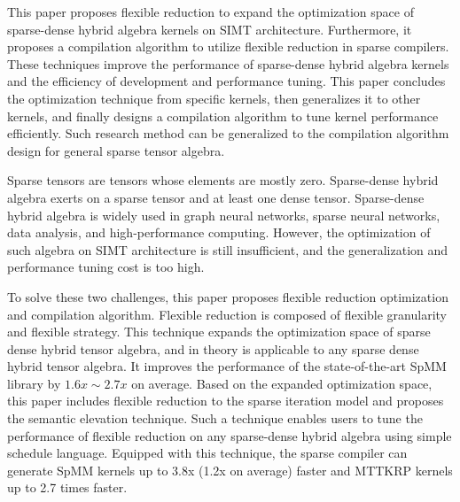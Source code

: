 \begin{abstract*}
  This paper proposes flexible reduction to expand the optimization space of sparse-dense hybrid algebra kernels on SIMT architecture.
  Furthermore, it proposes a compilation algorithm to utilize flexible reduction in sparse compilers. These techniques improve the performance of 
  sparse-dense hybrid algebra kernels and the efficiency of development and performance tuning. This paper concludes the optimization technique from specific kernels, then generalizes it to other kernels, and finally designs 
  a compilation algorithm to tune kernel performance efficiently. Such research method can be generalized to the compilation algorithm design for general sparse tensor algebra.

  Sparse tensors are tensors whose elements are mostly zero. Sparse-dense hybrid algebra exerts on a sparse tensor and at least one dense tensor. 
  Sparse-dense hybrid algebra is widely used in graph neural networks, sparse neural networks, data analysis, and high-performance computing. 
  However, the optimization of such algebra on SIMT architecture is still insufficient, and the generalization and performance tuning cost is too high.

  To solve these two challenges, this paper proposes flexible reduction optimization and compilation algorithm. Flexible reduction is composed of flexible granularity and flexible strategy. 
  This technique expands the optimization space of sparse dense hybrid tensor algebra, and in theory is applicable to any sparse dense hybrid tensor algebra. It improves the performance
  of the state-of-the-art SpMM library by $1.6x \sim 2.7x$ on average. Based on the expanded optimization space, this paper includes flexible reduction to the sparse iteration model and proposes the semantic elevation technique.
  Such a technique enables users to tune the performance of flexible reduction on any sparse-dense hybrid algebra using simple schedule language. Equipped with this technique, the sparse compiler can generate SpMM kernels up to 3.8x (1.2x on average) faster and MTTKRP kernels up to 2.7 times faster.
\end{abstract*}
